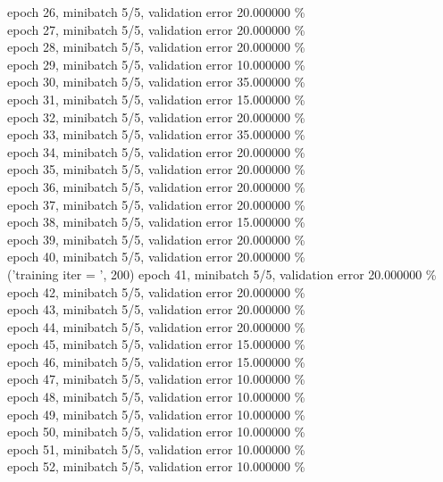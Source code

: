 \documentclass[a4paper]{article}
\begin{document}
epoch 26, minibatch 5/5, validation error 20.000000 \% \\
epoch 27, minibatch 5/5, validation error 20.000000 \% \\
epoch 28, minibatch 5/5, validation error 20.000000 \% \\
epoch 29, minibatch 5/5, validation error 10.000000 \% \\
epoch 30, minibatch 5/5, validation error 35.000000 \% \\
epoch 31, minibatch 5/5, validation error 15.000000 \% \\
epoch 32, minibatch 5/5, validation error 20.000000 \% \\
epoch 33, minibatch 5/5, validation error 35.000000 \% \\
epoch 34, minibatch 5/5, validation error 20.000000 \% \\
epoch 35, minibatch 5/5, validation error 20.000000 \% \\
epoch 36, minibatch 5/5, validation error 20.000000 \% \\
epoch 37, minibatch 5/5, validation error 20.000000 \% \\
epoch 38, minibatch 5/5, validation error 15.000000 \% \\
epoch 39, minibatch 5/5, validation error 20.000000 \% \\
epoch 40, minibatch 5/5, validation error 20.000000 \% \\
('training \@ iter = ', 200)
epoch 41, minibatch 5/5, validation error 20.000000 \% \\
epoch 42, minibatch 5/5, validation error 20.000000 \% \\
epoch 43, minibatch 5/5, validation error 20.000000 \% \\
epoch 44, minibatch 5/5, validation error 20.000000 \% \\
epoch 45, minibatch 5/5, validation error 15.000000 \% \\
epoch 46, minibatch 5/5, validation error 15.000000 \% \\
epoch 47, minibatch 5/5, validation error 10.000000 \% \\
epoch 48, minibatch 5/5, validation error 10.000000 \% \\
epoch 49, minibatch 5/5, validation error 10.000000 \% \\
epoch 50, minibatch 5/5, validation error 10.000000 \% \\
epoch 51, minibatch 5/5, validation error 10.000000 \% \\
epoch 52, minibatch 5/5, validation error 10.000000 \% \\
\end{document}

